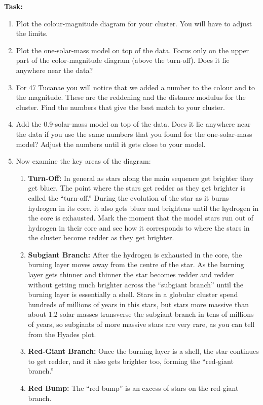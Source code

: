 \documentclass{article}
\begin{document}
\textbf{Task:}
\begin{enumerate}
 \setlength\itemsep{0em}
\item Plot the colour-magnitude diagram for your cluster.  You will have to adjust the limits.
\item Plot the one-solar-mass model on top of the data.  Focus only on the upper part of the color-magnitude diagram (above the turn-off). Does it lie anywhere near the data?
\item For 47 Tucanae you will notice that we added a number to the colour and to the magnitude.  These are the reddening and the distance modulus for the cluster.   Find the numbers that give the best match to your cluster.
\item Add the 0.9-solar-mass model on top of the data.  Does it lie anywhere near the data if you use the same numbers that you found for the one-solar-mass model?  Adjust the numbers until it gets close to your model.
\item Now examine the key areas of the diagram:
\begin{enumerate}
 \setlength\itemsep{0em}
    \item \textbf{Turn-Off:}
    In general as stars along the main sequence get brighter they get bluer.  The point where the stars get redder as they get brighter is called the ``turn-off.''  During the evolution of the star as it burns hydrogen in its core, it also gets bluer and brightens until the hydrogen in the core is exhausted.  Mark the moment that the model stars run out of hydrogen in their core and see how it corresponds to where the stars in the cluster become redder as they get brighter.
    \item \textbf{Subgiant Branch:}
    After the hydrogen is exhausted in the core, the burning layer moves away from the centre of the star.  As the burning layer gets thinner and thinner the star becomes redder and redder without getting much brighter across the ``subgiant branch'' until the burning layer is essentially a shell. Stars in a globular cluster spend hundreds of millions of years in this stars, but stars more massive than about 1.2 solar masses transverse the subgiant branch in tens of millions of years, so subgiants of more massive stars are very rare, as you can tell from the Hyades plot.
    \item \textbf{Red-Giant Branch:}
    Once the burning layer is a shell, the star continues to get redder, and it also gets brighter too, forming the ``red-giant branch.''
    \item \textbf{Red Bump:} The ``red bump'' is an excess of stars on the red-giant branch.  
    

\end{enumerate}
\end{enumerate}
\end{document}
